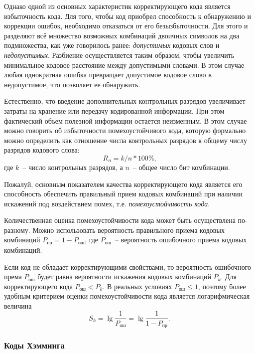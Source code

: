 \documentclass[12pt,a4paper]{article}
\begin{document}
  Однако одной из основных характеристик корректирующего кода является избыточность кода. Для того, чтобы код приобрел способность к обнаружению и коррекции ошибок, необходимо отказаться от его безызбыточности. Для этого и разделяют всё множество возможных комбинаций двоичных символов на два подмножества, как уже говорилось ранее: \emph{допустимых} кодовых слов и \emph{недопустимых}. Разбиение осуществляется таким образом, чтобы увеличить минимальное кодовое расстояние между допустимыми словами. В этом случае любая однократная ошибка превращает допустимое кодовое слово в недопустимое, что позволяет ее обнаружить.
  
  Естественно, что введение дополнительных контрольных разрядов увеличивает затраты на хранение или передачу кодированной информации. При этом фактический объем полезной информации остается неизменным. В этом случае можно говорить об избыточности помехоустойчивого кода, которую формально можно определить как отношение числа контрольных разрядов к общему числу разрядов кодового слова:
  \begin{equation}
    \nonumber
    R_n=k/n*100\%\text{,}
  \end{equation}
где $k$~-- число контрольных разрядов, а $n$~-- общее число бит комбинации.
  
  Пожалуй, основным показателем качества корректирующего кода является его способность обеспечить правильный прием кодовых комбинаций при наличии искажений под воздействием помех, т.е. \emph{помехоустойчивость кода}.
  
  Количественная оценка помехоустойчивости кода может быть осуществлена по-разному. Можно использовать вероятность правильного приема кодовых комбинаций $P_\text{пр}=1-P_\text{ош}$, где $P_\text{ош}$~-- вероятность ошибочного приема кодовых комбинаций.
  
  Если код не обладает корректирующими свойствами, то вероятность ошибочного према $P_\text{ош}$ будет равна вероятности искажения кодовых комбинаций $P_k$. Для корректирующего кода $P_\text{ош}<P_k$. В реальных условиях $P_\text{ош}\leq 1$, поэтому более удобным критерием оценки помехоустойчивости кода является логарифмическая величина
  \begin{equation}
    \nonumber
    S_k=\lg{\frac{1}{P_\text{ош}}}=\lg{\frac{1}{1-P_\text{пр}}}\text{.}
  \end{equation}
  
\subsubsection{Коды Хэмминга}
  
\end{document}
